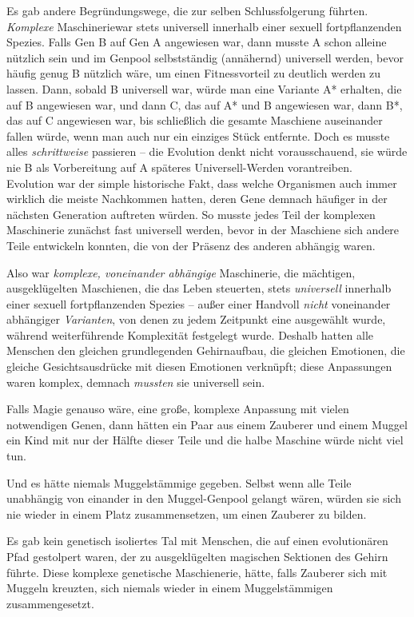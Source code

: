 {Es gab andere Begründungswege, die zur selben Schlussfolgerung führten. \emph{Komplexe} Maschineriewar stets universell innerhalb einer sexuell fortpflanzenden Spezies. Falls Gen B auf Gen A angewiesen war, dann musste A schon alleine nützlich sein und im Genpool selbstständig (annähernd) universell werden, bevor häufig genug B nützlich wäre, um einen Fitnessvorteil zu deutlich werden zu lassen. Dann, sobald B universell war, würde man eine Variante A* erhalten, die auf B angewiesen war, und dann C, das auf A* und B angewiesen war, dann B*, das auf C angewiesen war, bis schließlich die gesamte Maschiene auseinander fallen würde, wenn man auch nur ein einziges Stück entfernte. Doch es musste alles \emph{schrittweise} passieren -- die Evolution denkt nicht vorausschauend, sie würde nie B als Vorbereitung auf A späteres Universell-Werden vorantreiben.\\ Evolution war der simple historische Fakt, dass welche Organismen auch immer wirklich die meiste Nachkommen hatten, deren Gene demnach häufiger in der nächsten Generation auftreten würden. So musste jedes Teil der komplexen Maschinerie zunächst fast universell werden, bevor in der Maschiene sich andere Teile entwickeln konnten, die von der Präsenz des anderen abhängig waren.

Also war \emph{komplexe, voneinander abhängige} Maschinerie, die mächtigen, ausgeklügelten Maschienen, die das Leben steuerten, stets \emph{universell} innerhalb einer sexuell fortpflanzenden Spezies -- außer einer Handvoll \emph{nicht} voneinander abhängiger \emph{Varianten}, von denen zu jedem Zeitpunkt eine ausgewählt wurde, während weiterführende Komplexität festgelegt wurde. Deshalb hatten alle Menschen den gleichen grundlegenden Gehirnaufbau, die gleichen Emotionen, die gleiche Gesichtsausdrücke mit diesen Emotionen verknüpft; diese Anpassungen waren komplex, demnach \emph{mussten} sie universell sein.

Falls Magie genauso wäre, eine große, komplexe Anpassung mit vielen notwendigen Genen, dann hätten ein Paar aus einem Zauberer und einem Muggel ein Kind mit nur der Hälfte dieser Teile und die halbe Maschine würde nicht viel tun.

Und es hätte niemals Muggelstämmige gegeben. Selbst wenn alle Teile unabhängig von einander in den Muggel-Genpool gelangt wären, würden sie sich nie wieder in einem Platz zusammensetzen, um einen Zauberer zu bilden.

Es gab kein genetisch isoliertes Tal mit Menschen, die auf einen evolutionären Pfad gestolpert waren, der zu ausgeklügelten magischen Sektionen des Gehirn führte. Diese komplexe genetische Maschienerie, hätte, falls Zauberer sich mit Muggeln kreuzten, sich niemals wieder in einem Muggelstämmigen zusammengesetzt.

}
